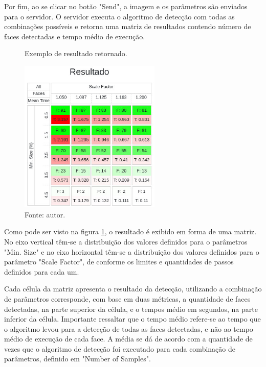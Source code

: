 Por fim, ao se clicar no botão "Send", a imagem e os parâmetros são enviados para o servidor. O servidor executa o algoritmo de detecção com todas as combinações possíveis e retorna uma matriz de resultados contendo número de faces detectadas e tempo médio de execução.

\begin{figure}[h]
    \centering
    \caption[Exemplo de resultado retornado.]{Exemplo de resultado retornado.}
    \includegraphics[width=0.6\textwidth]{Cap3_Desenvolvimento/Figures/exemplo_resultado_matriz.jpg}
    \caption*{Fonte: autor.}
    \label{fig:matrizResultado}
\end{figure}

Como pode ser visto na figura \ref{fig:matrizResultado}, o resultado é exibido em forma de uma matriz. No eixo vertical têm-se a distribuição dos valores definidos para o parâmetros "Min. Size" e no eixo horizontal têm-se a distribuição dos valores definidos para o parâmetro "Scale Factor", de conforme os limites e quantidades de passos definidos para cada um.

Cada célula da matriz apresenta o resultado da detecção, utilizando a combinação de parâmetros corresponde, com base em duas métricas, a quantidade de faces detectadas, na parte superior da célula, e o tempos médio em segundos, na parte inferior da célula. Importante ressaltar que o tempo médio refere-se ao tempo que o algoritmo levou para a detecção de todas as faces detectadas, e não ao tempo médio de execução de cada face. A média se dá de acordo com a quantidade de vezes que o algoritmo de detecção foi executado para cada combinação de parâmetros, definido em "Number of Samples".

